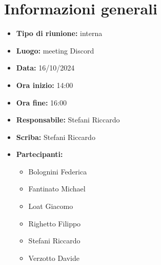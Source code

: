 \section{Informazioni generali}

\begin{itemize}
    \item \textbf{Tipo di riunione:} interna
    \item \textbf{Luogo:} meeting Discord
    \item \textbf{Data:} 16/10/2024
    \item \textbf{Ora inizio:} 14:00
    \item \textbf{Ora fine:} 16:00
    \item \textbf{Responsabile:} Stefani Riccardo
    \item \textbf{Scriba:} Stefani Riccardo
    \item \textbf{Partecipanti:}
    \begin{itemize}
        \renewcommand{\labelitemii}{--}
        \item Bolognini Federica
        \item Fantinato Michael
        \item Loat Giacomo
        \item Righetto Filippo
        \item Stefani Riccardo
        \item Verzotto Davide
    \end{itemize}
\end{itemize}
